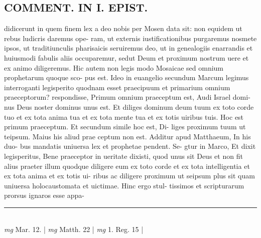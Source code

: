 \documentclass{article}
\begin{document}
\begin{pages}
\section*{COMMENT. IN I. EPIST. }\pstart didicerunt in quem finem lex a deo nobis per Mosen data sit: non equidem ut rebus ludicris daremus ope- ram, ut externis iustificationibus purgaremus nosmete ipsos, ut traditiunculis pharisaicis seruiremus deo, ut in genealogiis enarrandis et huiusmodi fabulis aliis occuparemur, sedut Deum et proximum nostrum uere et ex animo diligeremus. Hic autem non legis modo Mosaicae sed omnium prophetarum quoque sco- pus est. Ideo in euangelio secundum Marcum legimus interroganti legisperito quodnam esset praecipuum et primarium omnium praeceptorum? respondisse, Primum omnium praeceptum est, Audi Israel domi- nus Deus noster dominus unus est. Et diliges dominum deum tuum ex toto corde tuo et ex tota anima tua et ex tota mente tua et ex totis uiribus tuis. Hoc est primum praeceptum. Et secundum simile hoc est, Di- liges proximum tuum ut teipsum. Maius his aliud prae ceptum non est. Additur apud Matthaeum, In his duo- bus mandatis uniuersa lex et prophetae pendent. Se- gtur in Marco, Et dixit legisperitus, Bene praeceptor in ueritate dixisti, quod unus sit Deus et non fit alius praeter illum quodque diligere eum ex toto corde et ex tota intelligentia et ex tota anima et ex totis ui- ribus ac diligere proximum ut seipsum plus sit quam uniuersa holocaustomata et uictimae. Hinc ergo stul- tissimos et scripturarum prorsus ignaros esse appa-  \pend
\vspace{0.5cm}\noindent
\vspace{0.2cm}\rule{1cm}{0.2pt}\\ 
\hspace{0.2cm}\textit{mg}
\footnotesize Mar. 12. 
\normalsize| 
\hspace{0.2cm}\textit{mg}
\footnotesize Matth. 22 
\normalsize| 
\hspace{0.2cm}\textit{mg}
\footnotesize 1. Reg. 15 
\normalsize| 

\end{pages}
\end{document}
